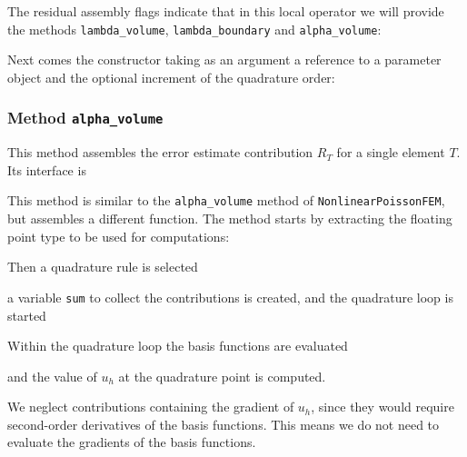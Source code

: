 \documentclass[a4paper,12pt]{article}
\begin{document}
The residual assembly flags indicate that in this local operator we will provide
the methods \lstinline{lambda_volume}, \lstinline{lambda_boundary}
and \lstinline{alpha_volume}:


Next comes the constructor taking as an argument a reference to a
parameter object and the optional increment of the quadrature order:


\subsubsection*{Method \lstinline{alpha_volume}}

This method assembles the error estimate contribution $R_T$ for a single element $T$. 
Its interface is


This method is similar to the \lstinline{alpha_volume} method of
\lstinline{NonlinearPoissonFEM}, but assembles a different function.
The method starts by extracting the floating point type to be used for
computations:


Then a quadrature rule is selected

a variable \lstinline{sum} to collect the contributions is created, and the
quadrature loop is started


Within the quadrature loop the basis functions are evaluated

and the value of $u_h$ at the quadrature point is computed.

We neglect contributions containing the gradient of $u_h$, since they
would require second-order derivatives of the basis functions. This means we
do not need to evaluate the gradients of the basis functions.
\end{document}

